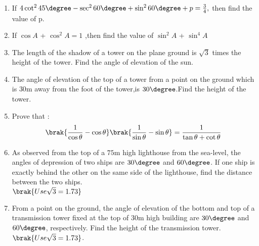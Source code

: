\begin{enumerate}

\item If $4 \cot^{2}45\degree-\sec^{2}60\degree+\sin^{2}60\degree+p=\frac{3}{4},$ then find the value of p.

\item If $\cos A$ + $\cos^{2}A = 1$ ,then find the value of $\sin^{2}A$ + $\sin^{4}A$

\item The length of the shadow of a tower on the plane ground is $ \sqrt3 $ times the height of the tower. Find the angle of elevation of the sun.

\item The angle of elevation of the top of a tower from a point on the ground which is $30 \mathrm{m}$ away from the foot of the tower,is $30\degree$.Find the height of the tower.

\item Prove that :
\begin{align}
	\brak{\frac{1}{\cos\theta}-\cos\theta} \brak{\frac{1}{\sin\theta}-\sin\theta} = \frac{1}{\tan\theta + \cot\theta}
\end{align}

\item As observed from the top of a $75 \mathrm{m}$ high lighthouse from the sea-level, the angles of depression of two ships are $30\degree$ and $60\degree$. If one ship is exactly behind the other on the same side of the lighthouse, find the distance between the two ships.\\
	$\brak{Use \sqrt{3} = 1.73}$

\item From a point on the ground, the angle of elevation of the bottom and top of a transmission tower fixed at the top of $30 \mathrm{m}$ high building are $30\degree$ and $60\degree$, respectively. Find the height of the transmission tower. $\brak{Use\sqrt{3} = 1.73}$.
\end{enumerate}


